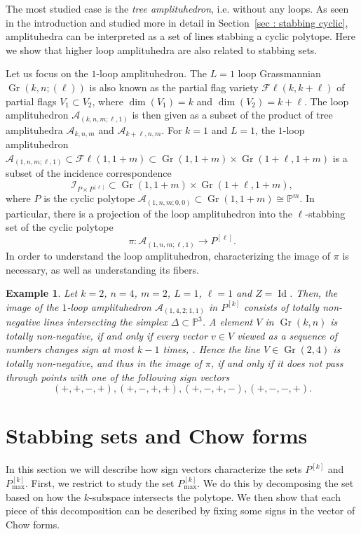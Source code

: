 \documentclass[english]{ourlematema}
\newtheorem{example}[thm]{Example}
\DeclareMathOperator{\Gr}{Gr}
\DeclareMathOperator{\Id}{Id}
\newcommand{\PP}{\mathbb{P}}
\newcommand{\Pk}{P^{[k]}}
\newcommand{\Pkmax}{P^{[k]}_{\max}}
\newcommand{\Fl}{\mathscr{F}\!\ell}
\begin{document}
The most studied case is the \emph{tree amplituhedron}, i.e. without any loops. As seen in the introduction and studied more in detail in Section~\ref{sec : stabbing cyclic}, amplituhedra can be interpreted as a set of lines stabbing a cyclic polytope. Here we show that higher loop amplituhedra are also related to stabbing sets.

Let us focus on the $1$-loop amplituhedron. The $L=1$ loop Grassmannian $\Gr(k,n;(\ell))$ is also known as the partial flag variety $\Fl(k,k+\ell)$ of partial flags $V_1 \subset V_2$, where $\dim(V_1)=k$ and $\dim(V_2)=k+\ell$.
The loop amplituhedron $\mathcal{A}_{(k,n,m;\ell,1)}$ is then given as a subset of the product of tree amplituhedra $\mathcal{A}_{k,n,m}$ and $\mathcal{A}_{k+\ell,n,m}$. 
For $k=1$ and $L=1$, the $1$-loop amplituhedron $\mathcal{A}_{(1,n,m;\ell,1)}\subset \Fl(1,1+m)\subset \Gr(1,1+m)\times \Gr(1+\ell,1+m)$ is a subset of the incidence correspondence 
\[\mathcal{I}_{P \times P^{[\ell]}} \subset \Gr(1,1+m)\times \Gr(1+\ell,1+m),\]
where $P$ is the cyclic polytope $ \mathcal{A}_{(1,n,m;0,0)}\subset \Gr(1,1+m)\cong \mathbb{P}^m.$
In particular, there is a projection of the loop amplituhedron into the $\ell$-stabbing set of the cyclic polytope 
\[\pi:\mathcal{A}_{(1,n,m;\ell,1)} \to P^{[\ell]}.\]
In order to understand the loop amplituhedron, characterizing the image of $\pi$ is necessary, as well as understanding its fibers.

\begin{example}
Let $k=2$, $n=4$, $m=2$, $L=1$, $\ell=1$ and $Z=\Id$. Then, the image of the $1$-loop amplituhedron $\mathcal{A}_{(1,4,2;1,1)}$ in $\Pk$ consists of totally non-negative lines intersecting the simplex $\Delta \subset \PP^3$.
A element $V$ in $\Gr(k,n)$ is totally non-negative, if and only if every vector $v\in V$ viewed as a sequence of numbers changes sign at most $k-1$ times, \cite[Theorem 1.6]{karp}. Hence the line $V \in \Gr(2,4)$ is totally non-negative, and thus in the image of $\pi$, if and only if it does not pass through points with one of the following sign vectors 
\[(+,+,-,+),(+,-,+,+),(+,-,+,-),(+,-,-,+).\]
\end{example}

\section{Stabbing sets and Chow forms}\label{sec : max stabb sign}

In this section we will describe how sign vectors characterize the sets $\Pk$ and $\Pkmax$. 
First, we restrict to study the set $\Pkmax$. 
We do this by decomposing the set based on how the $k$-subspace intersects the polytope. We then show that each piece of this decomposition can be described by fixing some signs in the vector of Chow forms.
\end{document}
